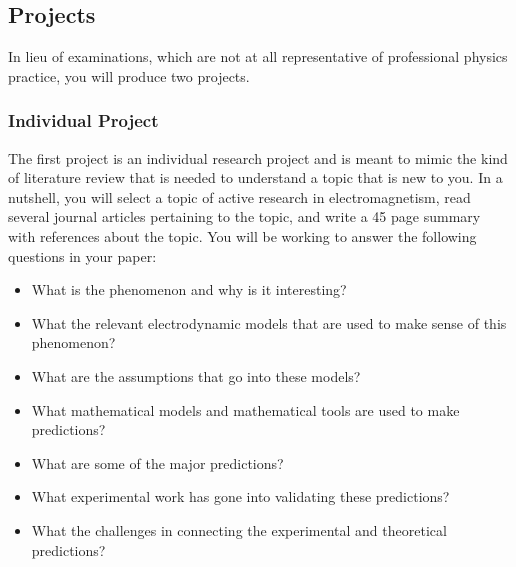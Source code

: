 \documentclass[letterpaper,10pt,english]{jupyterBook}
\begin{document}
\subsection{Projects}
\label{\detokenize{content/0_course/assessments:projects}}
\sphinxAtStartPar
In lieu of examinations, which are not at all representative of professional physics practice, you will produce two projects.


\subsubsection{Individual Project}
\label{\detokenize{content/0_course/assessments:individual-project}}
\sphinxAtStartPar
The first project is an individual research project and is meant to mimic the kind of literature review that is needed to understand a topic that is new to you. In a nutshell, you will select a topic of active research in electromagnetism, read several journal articles pertaining to the topic, and write a 4\sphinxhyphen{}5 page summary with references about the topic. You will be working to answer the following questions in your paper:
\begin{itemize}
\item {} 
\sphinxAtStartPar
What is the phenomenon and why is it interesting?

\item {} 
\sphinxAtStartPar
What the relevant electrodynamic models that are used to make sense of this phenomenon?

\item {} 
\sphinxAtStartPar
What are the assumptions that go into these models?

\item {} 
\sphinxAtStartPar
What mathematical models and mathematical tools are used to make predictions?

\item {} 
\sphinxAtStartPar
What are some of the major predictions?

\item {} 
\sphinxAtStartPar
What experimental work has gone into validating these predictions?

\item {} 
\sphinxAtStartPar
What the challenges in connecting the experimental and theoretical predictions?

\end{itemize}
\end{document}
